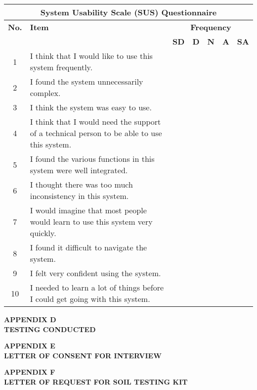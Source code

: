 {	\begin{table}[H]
		\centering
		\renewcommand{\arraystretch}{1.3}
		\begin{tabular}{|c|p{8cm}|c|c|c|c|c|}
			\hline
			\multicolumn{7}{|c|}{\textbf{System Usability Scale (SUS) Questionnaire}} \\ \hline
			\textbf{No.} & \centering\textbf{Item} & \multicolumn{5}{c|}{\textbf{Frequency}} \\ \hline
			&  & \textbf{SD} & \textbf{D} & \textbf{N} & \textbf{A} & \textbf{SA} \\ \hline
			1 & I think that I would like to use this system frequently. & & & & & \\ \hline
			2 & I found the system unnecessarily complex. & & & & & \\ \hline
			3 & I think the system was easy to use. & & & & & \\ \hline
			4 & I think that I would need the support of a technical person to be able to use this system. & & & & & \\ \hline
			5 & I found the various functions in this system were well integrated. & & & & & \\ \hline
			6 & I thought there was too much inconsistency in this system. & & & & & \\ \hline
			7 & I would imagine that most people would learn to use this system very quickly. & & & & & \\ \hline
			8 & I found it difficult to navigate the system. & & & & & \\ \hline
			9 & I felt very confident using the system. & & & & & \\ \hline
			10 & I needed to learn a lot of things before I could get going with this system. & & & & & \\ \hline
		\end{tabular}
	\end{table}
	
	\newpage
	
	\textbf{APPENDIX D}\\[1em]
	\textbf{TESTING CONDUCTED}
	
	\newpage
	
	\textbf{APPENDIX E}\\[1em]
	\textbf{LETTER OF CONSENT FOR INTERVIEW}
	
	\newpage
	
	\textbf{APPENDIX F}\\[1em]
	\textbf{LETTER OF REQUEST FOR SOIL TESTING KIT}
	
}
